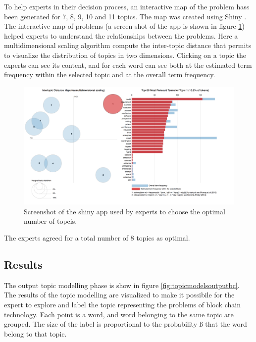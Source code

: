 \documentclass[]{book}
\begin{document}
To help experts in their decision process, an interactive map of the
problem hass been generated for 7, 8, 9, 10 and 11 topics. The map was
created using Shiny \citep{shiny2017}. The interactive map of problems
(a screen shot of the app is shown in figure
\ref{fig:topicmodelschinybc}) helped experts to understand the
relationships between the problems. Here a multidimensional scaling
algorithm compute the inter-topic distance that permits to visualize the
distribution of topics in two dimensions. Clicking on a topic the
experts can see its content, and for each word can see both at the
estimated term frequency within the selected topic and at the overall
term frequency.

\begin{figure}

{\centering \includegraphics[width=0.8\linewidth]{_bookdown_files/figures/bc_topicmodel_shiny} 

}

\caption{Screenshot of the shiny app used by experts to choose the optimal number of topcis. }\label{fig:topicmodelschinybc}
\end{figure}

The experts agreed for a total number of 8 topics as optimal.

\subsection{Results}\label{results-5}

The output topic modelling phase is show in figure
\ref{fig:topicmodelsoutputbc}. The results of the topic modelling are
visualized to make it possibile for the expert to explore and label the
topic representing the problems of block chain technology. Each point is
a word, and word belonging to the same topic are grouped. The size of
the label is proportional to the probability ß that the word belong to
that topic.
\end{document}
